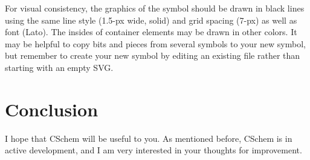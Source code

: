 \documentclass[11pt]{report}
\begin{document}
For visual
consistency,  the graphics of the symbol should be drawn in black
lines using the same line style (1.5-px wide, solid)
and grid spacing (7-px) as well as font (Lato). The insides of
container elements may be drawn in other colors. It may be helpful to
copy bits and pieces from several symbols to your new symbol, but
remember to create your new symbol by editing an existing file rather
than starting with an empty SVG.

\chapter{Conclusion}

I hope that CSchem will be useful to you. As mentioned before, CSchem
is in active development, and I am very interested in your thoughts
for improvement.
\end{document}
